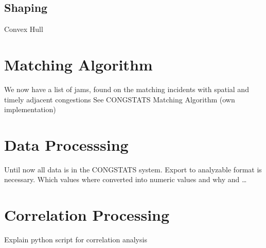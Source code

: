 \documentclass[a4paper,12pt]{report}
\begin{document}
\subsection{Shaping}

Convex Hull
\begin{figure}
	\centering
\end{figure}


\section{Matching Algorithm}
We now have a list of jams, found on the matching incidents with spatial and timely adjacent congestions
See CONGSTATS Matching Algorithm (own implementation)

\section{Data Processsing}
\label{methodology_data_generation}
Until now all data is in the CONGSTATS system. Export to analyzable format is necessary.
Which values where converted into numeric values and why and …


\section{Correlation Processing}
\label{definition_correlation_script}

Explain python script for correlation analysis
\end{document}
